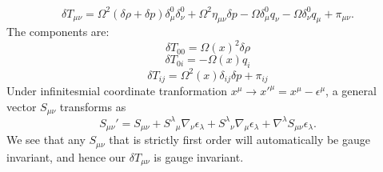 \documentclass[10pt,letterpaper]{article}
\begin{document}
\begin{equation}
	\delta T_{\mu\nu} = \Omega^2(\delta \rho + \delta p)\delta^0_\mu \delta^0_\nu + \Omega^2  \eta_{\mu\nu}\delta p - \Omega \delta^0_\mu q_\nu -\Omega\delta^0_\nu q_\mu + \pi_{\mu\nu}.
\end{equation}
The components are:
\begin{equation}
\delta T_{00} = \Omega(x)^2 \delta \rho
\end{equation}
\begin{equation}
\delta T_{0i} = -\Omega(x) q_i
\end{equation}
\begin{equation}
\delta T_{ij} = \Omega^2(x) \delta_{ij} \delta p + \pi_{ij}
\end{equation}
Under infinitesmial coordinate tranformation $x^\mu \to x'^\mu = x^\mu - \epsilon^\mu$, a general vector $S_{\mu\nu}$ transforms as
\begin{equation}
	S_{\mu\nu}' = S_{\mu\nu} +S^{\lambda}{}_{\mu}\nabla_\nu \epsilon_\lambda +S^\lambda{}_{\nu}\nabla_\mu\epsilon_\lambda
+ \nabla^{\lambda}S_{\mu\nu}\epsilon_\lambda.
\end{equation}
We see that any $S_{\mu\nu}$ that is strictly first order will automatically be gauge invariant, and hence our $\delta T_{\mu\nu}$ is gauge invariant. 
\end{document}
